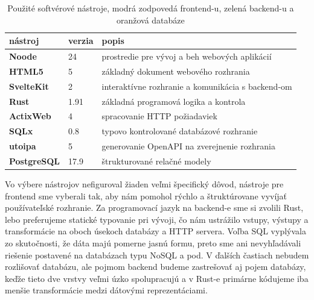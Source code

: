 \begin{table}[h!]
    \begin{center}
        \begin{tabularx}{\textwidth}{ |l|l|X| } 
         \hline
         \textbf{nástroj} & \textbf{verzia} & \textbf{popis} \\ 
         \hline
         \hline
         \rowcolor{cyan!50}
         \textbf{Noode} & 24 & prostredie pre vývoj a beh webových aplikácií \\ 
         \hline
         \rowcolor{cyan!50}
         \textbf{HTML5} & 5 & základný dokument webového rozhrania \\ 
         \hline
         \rowcolor{cyan!50}
         \textbf{SvelteKit} & 2 & interaktívne rozhranie a komunikácia s backend-om \\ 
         \hline
         \rowcolor{lime!50}
         \textbf{Rust} & 1.91 & základná programová logika a kontrola \\ 
         \hline
         \rowcolor{lime!50}
         \textbf{ActixWeb} & 4 & spracovanie HTTP požiadaviek \\ 
         \hline
         \rowcolor{lime!50}
         \textbf{SQLx} & 0.8 & typovo kontrolované databázové rozhranie \\ 
         \hline
         \rowcolor{lime!50}
         \textbf{utoipa} & 5 & generovanie OpenAPI na zverejnenie rozhrania \\ 
         \hline
         \rowcolor{orange!50}
         \textbf{PostgreSQL} & 17.9 & štrukturované relačné modely \\ 
         \hline
        \end{tabularx}
    \end{center}
    \caption{Použité softvérové nástroje, modrá zodpovedá frontend-u, zelená backend-u a oranžová databáze}
    \label{tab:swvers}
\end{table}

Vo výbere nástrojov nefiguroval žiaden veľmi špecifický dôvod, nástroje pre frontend sme vyberali tak, aby nám pomohol rýchlo a
štruktúrovane vyvíjať používateľské rozhranie. Za programovací jazyk na backend-e sme si zvolili Rust, lebo preferujeme statické typovanie pri vývoji,
čo nám ustrážilo vstupy, výstupy a transformácie na oboch úsekoch databázy a HTTP servera. Voľba SQL vyplývala zo skutočnosti,
že dáta majú pomerne jasnú formu, preto sme ani nevyhľadávali riešenie postavené na databázach typu NoSQL a pod. V ďalších častiach
nebudem rozlišovať databázu, ale pojmom backend budeme zastrešovať aj pojem databázy, keďže tieto dve vrstvy veľmi úzko spolupracujú
a v Rust-e primárne kódujeme iba menšie transformácie medzi dátovými reprezentáciami.

